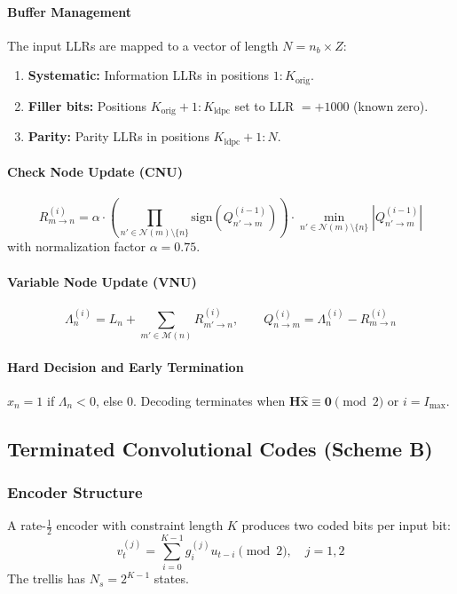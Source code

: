 \documentclass[12pt, a4paper]{article}
\begin{document}
\paragraph{Buffer Management}
The input LLRs are mapped to a vector of length $N = n_b \times Z$:
\begin{enumerate}
    \item \textbf{Systematic:} Information LLRs in positions $1:K_{\text{orig}}$.
    \item \textbf{Filler bits:} Positions $K_{\text{orig}}+1:K_{\text{ldpc}}$ set to LLR $= +1000$ (known zero).
    \item \textbf{Parity:} Parity LLRs in positions $K_{\text{ldpc}}+1:N$.
\end{enumerate}

\paragraph{Check Node Update (CNU)}
\begin{equation}
R_{m \to n}^{(i)} = \alpha \cdot \left(\prod_{n' \in \mathcal{N}(m)\setminus\{n\}} \text{sign}(Q_{n'\to m}^{(i-1)})\right) \cdot \min_{n' \in \mathcal{N}(m)\setminus\{n\}} |Q_{n'\to m}^{(i-1)}|
\end{equation}
with normalization factor $\alpha = 0.75$.

\paragraph{Variable Node Update (VNU)}
\begin{equation}
\Lambda_n^{(i)} = L_n + \sum_{m' \in \mathcal{M}(n)} R_{m'\to n}^{(i)},\qquad Q_{n\to m}^{(i)} = \Lambda_n^{(i)} - R_{m\to n}^{(i)}
\end{equation}

\paragraph{Hard Decision and Early Termination}
$\hat{x}_n = 1$ if $\Lambda_n < 0$, else $0$. Decoding terminates when $\mathbf{H}\hat{\mathbf{x}} \equiv \mathbf{0} \pmod{2}$ or $i = I_{\max}$.

\subsection{Terminated Convolutional Codes (Scheme B)}

\subsubsection{Encoder Structure}
A rate-$\frac{1}{2}$ encoder with constraint length $K$ produces two coded bits per input bit:
\begin{equation}
v_t^{(j)} = \sum_{i=0}^{K-1} g_i^{(j)} u_{t-i} \pmod{2},\quad j=1,2
\end{equation}
The trellis has $N_s = 2^{K-1}$ states.
\end{document}
